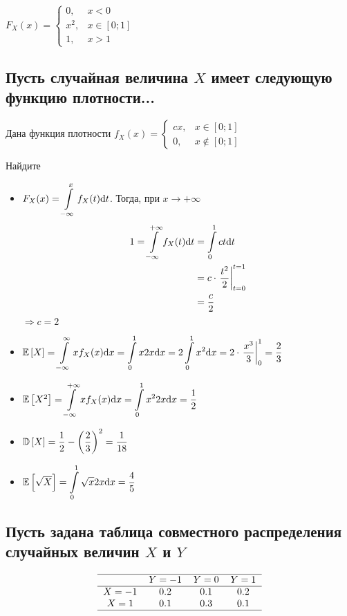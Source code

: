 \documentclass{article}
\begin{document}
\begin{itemize}
    $F_{X}(x)=\begin{cases}
        0,&x<0\\
        x^2,&x\in[0;1]\\
        1,&x>1
    \end{cases}$
\end{itemize}


\subsection{Пусть случайная величина $X$ имеет следующую функцию плотности...}
Дана функция плотности $f_{X}(x)=\begin{cases}
    cx,&x\in[0;1]\\
    0,&x\not\in[0;1]
\end{cases}$

Найдите
\begin{itemize}
    \item $F_X(x)=\displaystyle\int\limits_{-\infty}^{x} f_X(t)\text{d}t$. Тогда, при $x\to+\infty$
    \begin{equation*}
        \begin{aligned}
            1=\int\limits_{-\infty}^{+\infty} f_X(t)\text{d}t&=\int\limits_0^1 ct\text{d}t\\
            &=c\cdot\left.\frac{t^2}{2}\right\vert_{t=0}^{t=1}\\
            &=\frac{c}{2}
        \end{aligned}
    \end{equation*}
    $\Longrightarrow c=2$

    \item $\mathbb{E}\left[X\right]=\displaystyle\int\limits_{-\infty}^{\infty}xf_{X}(x)\text{d}x=\int\limits_{0}^1 x2x\text{d}x=2\int\limits_0^1 x^2\text{d}x=2\cdot\left.\frac{x^3}{3}\right\vert_{0}^1=\frac{2}{3}$
    \item $\mathbb{E}\left[X^2\right]=\displaystyle\int\limits_{-\infty}^{+\infty}xf_{X}(x)\text{d}x=\int\limits_{0}^1x^2 2x\text{d}x=\frac{1}{2}$
    \item $\mathbb{D}\left[X\right]=\displaystyle\frac{1}{2}-\left(\frac{2}{3}\right)^2=\frac{1}{18}$
    \item $\mathbb{E}\left[\sqrt{X}\right]=\displaystyle\int\limits_{0}^1\sqrt{x}2x\text{d}x=\frac{4}{5}$
\end{itemize}

\subsection{Пусть задана таблица совместного распределения случайных величин $X$ и $Y$}
\begin{equation*}
    \begin{tabular}{cccc}
        \hline
        &$Y=-1$&$Y=0$&$Y=1$\\
        \hline
        $X=-1$&0.2&0.1&0.2\\
        $X=1$&0.1&0.3&0.1\\
        \hline
    \end{tabular}
\end{equation*}
\end{document}
